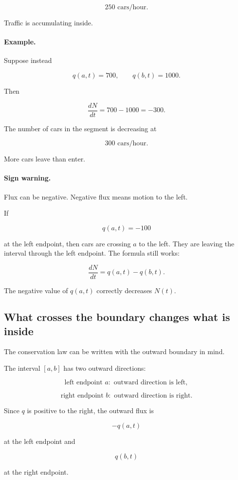 \[
250\text{ cars/hour}.
\]

Traffic is accumulating inside.

\paragraph{Example.}
Suppose instead

\[
q(a,t)=700,
\qquad
q(b,t)=1000.
\]

Then

\[
\frac{dN}{dt}=700-1000=-300.
\]

The number of cars in the segment is decreasing at

\[
300\text{ cars/hour}.
\]

More cars leave than enter.

\paragraph{Sign warning.}
Flux can be negative.  Negative flux means motion to the left.

If

\[
q(a,t)=-100
\]

at the left endpoint, then cars are crossing \(a\) to the left.  They are leaving the
interval through the left endpoint.  The formula still works:

\[
\frac{dN}{dt}=q(a,t)-q(b,t).
\]

The negative value of \(q(a,t)\) correctly decreases \(N(t)\).

\subsection{What crosses the boundary changes what is inside}
\label{subsec:what-crosses-boundary}

The conservation law can be written with the outward boundary in mind.

The interval \([a,b]\) has two outward directions:

\[
\text{left endpoint }a: \text{ outward direction is left},
\]

\[
\text{right endpoint }b: \text{ outward direction is right}.
\]

Since \(q\) is positive to the right, the outward flux is

\[
-q(a,t)
\]

at the left endpoint and

\[
q(b,t)
\]

at the right endpoint.

